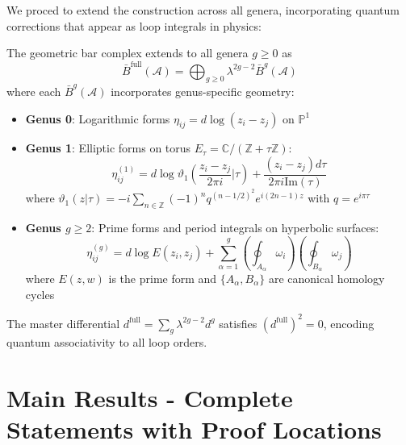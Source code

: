 We proced to extend the construction across all genera, incorporating quantum corrections that appear as loop integrals in physics:

\begin{theorem}
The geometric bar complex extends to all genera $g \geq 0$ as
$$\bar{B}^{\text{full}}(\mathcal{A}) = \bigoplus_{g \geq 0} \lambda^{2g-2} \bar{B}^g(\mathcal{A})$$
where each $\bar{B}^g(\mathcal{A})$ incorporates genus-specific geometry:
\begin{itemize}
\item \textbf{Genus 0}: Logarithmic forms $\eta_{ij} = d\log(z_i - z_j)$ on $\mathbb{P}^1$
\item \textbf{Genus 1}: Elliptic forms on torus $E_\tau = \mathbb{C}/(\mathbb{Z} + \tau\mathbb{Z})$:
  $$\eta_{ij}^{(1)} = d\log\vartheta_1\left(\frac{z_i - z_j}{2\pi i}|\tau\right) + \frac{(z_i - z_j)d\tau}{2\pi i \text{Im}(\tau)}$$
  where $\vartheta_1(z|\tau) = -i\sum_{n \in \mathbb{Z}}(-1)^n q^{(n-1/2)^2}e^{i(2n-1)z}$ with $q = e^{i\pi\tau}$
\item \textbf{Genus $g \geq 2$}: Prime forms and period integrals on hyperbolic surfaces:
  $$\eta_{ij}^{(g)} = d\log E(z_i, z_j) + \sum_{\alpha=1}^g \left(\oint_{A_\alpha} \omega_i\right) \left(\oint_{B_\alpha} \omega_j\right)$$
  where $E(z,w)$ is the prime form and $\{A_\alpha, B_\alpha\}$ are canonical homology cycles
\end{itemize}
The master differential $d^{\text{full}} = \sum_{g} \lambda^{2g-2} d^g$ satisfies $(d^{\text{full}})^2 = 0$, encoding quantum associativity to all loop orders.
\end{theorem}

\section{Main Results - Complete Statements with Proof Locations}
\label{sec:main-results-complete}

